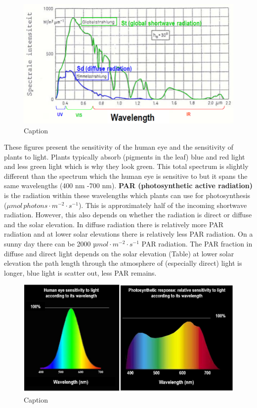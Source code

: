 \documentclass[12pt,oneside]{book}
\begin{document}
\begin{figure}

{\centering \includegraphics[width=0.9\linewidth]{figures/Figure128} 

}

\caption{Caption}\label{fig:Diffuse2}
\end{figure}

These figures present the sensitivity of the human eye and the
sensitivity of plants to light. Plants typically absorb (pigments in the
leaf) blue and red light and less green light which is why they look
green. This total spectrum is slightly different than the spectrum which
the human eye is sensitive to but it spans the same wavelengths (400 nm
-700 nm). \textbf{PAR (photosynthetic active radiation)} is the
radiation within these wavelengths which plants can use for
photosynthesis (\(\mu mol \, photons \cdot m^{-2} \cdot s^{-1}\)). This
is approximately half of the incoming shortwave radiation. However, this
also depends on whether the radiation is direct or diffuse and the solar
elevation. In diffuse radiation there is relatively more PAR radiation
and at lower solar elevations there is relatively less PAR radiation. On
a sunny day there can be 2000 \(µmol \cdot m^{-2} \cdot s^{-1}\) PAR
radiation. The PAR fraction in diffuse and direct light depends on the
solar elevation (Table) at lower solar elevation the path length through
the atmosphere of (especially direct) light is longer, blue light is
scatter out, less PAR remains.

\begin{figure}

{\centering \includegraphics[width=0.8\linewidth]{figures/Figure129} 

}

\caption{Caption}\label{fig:PAR}
\end{figure}
\end{document}
